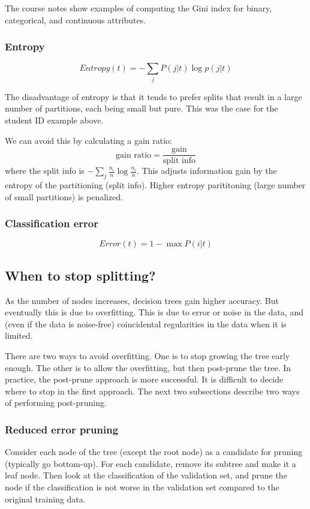 \documentclass[a4paper,12pt]{article}
\begin{document}
The course notes show examples of computing the Gini index for binary, categorical, and continuous attributes. 

\subsubsection{Entropy}

$$Entropy(t) = - \sum_j P(j|t) \log p(j|t)$$

The disadvantage of entropy is that it tends to prefer splits that result in a large number of partitions, each being small but pure. This was the case for the student ID example above. 

We can avoid this by calculating a gain ratio: 
$$\text{gain ratio} = \frac{\text{gain}}{\text{split info}}$$
where the split info is $-\sum_j \frac{n_i}{n} \log\frac{n_i}{n}$. This adjusts information gain by the entropy of the partitioning (split info). Higher entropy parititoning (large number of small partitions) is penalized. 

\subsubsection{Classification error}

$$Error(t) = 1 - \max P(i|t)$$


\subsection{When to stop splitting?}

As the number of nodes increases, decision trees gain higher accuracy. But eventually this is due to overfitting. This is due to error or noise in the data, and (even if the data is noise-free) coincidental regularities in the data when it is limited. 

There are two ways to avoid overfitting. One is to stop growing the tree early enough. The other is to allow the overfitting, but then post-prune the tree. In practice, the post-prune approach is more successful. It is difficult to decide where to stop in the first approach. The next two subsections describe two ways of performing post-pruning. 

\subsubsection{Reduced error pruning}

Consider each node of the tree (except the root node) as a candidate for pruning (typically go bottom-up). For each candidate, remove its subtree and make it a leaf node. Then look at the classification of the validation set, and prune the node if the classification is not worse in the validation set compared to the original training data. 
\end{document}
